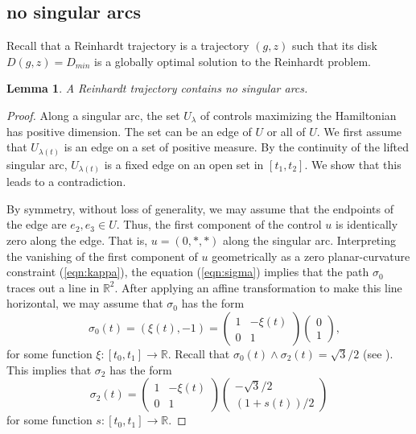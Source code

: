 \documentclass{article}
\newtheorem{lemma}[theorem]{Lemma}
\theoremstyle{remark}
\newcommand{\ring}[1]{\mathbb{#1}}
\def\DR{D_{min}}
\begin{document}
\subsection{no singular arcs}

Recall that a Reinhardt trajectory is a trajectory $(g,z)$ such
that its disk $D(g,z)=\DR$ is a globally optimal solution to the
Reinhardt problem.

\begin{lemma} A Reinhardt trajectory contains no
singular arcs.
\end{lemma}

\begin{proof} Along a singular arc, the set $U_\lambda$ 
of controls maximizing the Hamiltonian has positive dimension.
The set can be an edge of $U$ or all of $U$.
We first assume that $U_{\lambda(t)}$ is an edge on a set 
of positive measure.
By the continuity of the lifted singular arc,  $U_{\lambda(t)}$
is a fixed edge on an open set in $[t_1,t_2]$.
We show that this leads to a contradiction.


By symmetry, without loss of generality, we may assume
that the endpoints of the edge are $e_2,e_3\in U$.
Thus, the first component of the control $u$ is identically zero along
the edge.  That is, $u=(0,*,*)$ along the singular arc.  Interpreting
the vanishing of the first component of $u$ geometrically as a zero
planar-curvature constraint (\ref{eqn:kappa}), the equation
(\ref{eqn:sigma}) implies that the path $\sigma_0$ traces out a line
in $\ring{R}^2$.  After applying an affine transformation to make this
line horizontal, we may assume that $\sigma_0$ has the form
\[
\quad \sigma_0(t) = (\xi(t),-1) = 
\begin{pmatrix} 1 & -\xi(t) \\ 0 &1\end{pmatrix} 
\begin{pmatrix} 0\\1\end{pmatrix},
\]
for some function $\xi:[t_0,t_1]\to \ring{R}$.  Recall that
$\sigma_0(t) \wedge \sigma_2(t) = \sqrt{3}/2$ (see
\cite[\S3.2]{hales2011reinhardt}).  This implies
that $\sigma_2$ has the form
\[
\sigma_2(t) = \begin{pmatrix} 1 & -\xi(t) \\ 0 &1\end{pmatrix} 
\begin{pmatrix} -\sqrt{3}/2 \\ (1+s(t))/2\end{pmatrix}
\]
for some function $s:[t_0,t_1]\to \ring{R}$.


\end{proof}
\end{document}

